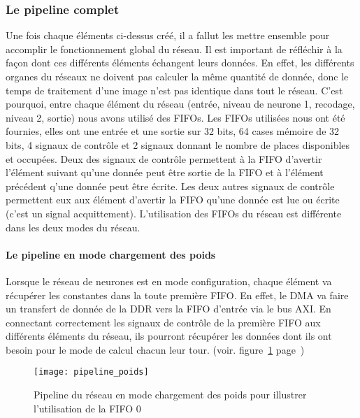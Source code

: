 \subsubsection{Le pipeline complet}
Une fois chaque éléments ci-dessus créé, il a fallut les mettre ensemble pour accomplir 
le fonctionnement global du réseau. Il est important de réfléchir à la façon dont ces différents éléments 
échangent leurs données. En effet, les différents organes du réseaux ne doivent pas calculer la même 
quantité de donnée, donc le temps de traitement d'une image n'est pas identique dans tout le réseau. 
C'est pourquoi, entre chaque élément du réseau (entrée, niveau de neurone 1, recodage, niveau 2, sortie) 
nous avons utilisé des FIFOs. Les FIFOs utilisées nous ont été fournies, elles ont une entrée et une sortie sur 32 bits, 
64 cases mémoire de 32 bits, 4 signaux de contrôle et 2 signaux donnant le nombre de places disponibles et occupées. 
Deux des signaux de contrôle permettent à la FIFO d'avertir l'élément suivant qu'une donnée peut être sortie de la FIFO 
et à l'élément précédent  q'une donnée peut être écrite. Les deux autres signaux de contrôle permettent eux aux élément 
d'avertir la FIFO qu'une donnée est lue ou écrite (c'est un signal acquittement). 
L'utilisation des FIFOs du réseau est différente dans les deux modes du réseau.
	\paragraph{Le pipeline en mode chargement des poids}
	Lorsque le réseau de neurones est en mode configuration, chaque élément va récupérer les constantes dans la 
	toute première FIFO. En effet, le DMA va faire un transfert de donnée de la DDR vers la FIFO d'entrée via le bus AXI. 
	En connectant correctement les signaux de contrôle de la première FIFO aux différents éléments du réseau, 
	ils pourront récupérer les données dont ils ont besoin pour le mode de calcul chacun leur tour. 
	(voir. figure~\ref{fig:pipeline_poids} page~\pageref{fig:pipeline_poids})
	
	\begin{figure}[h!]
		\texttt{[image: pipeline\_poids]}
		\caption{Pipeline du réseau en mode chargement des poids pour illustrer l'utilisation de la FIFO 0}
		\label{fig:pipeline_poids}
	\end{figure}
	
